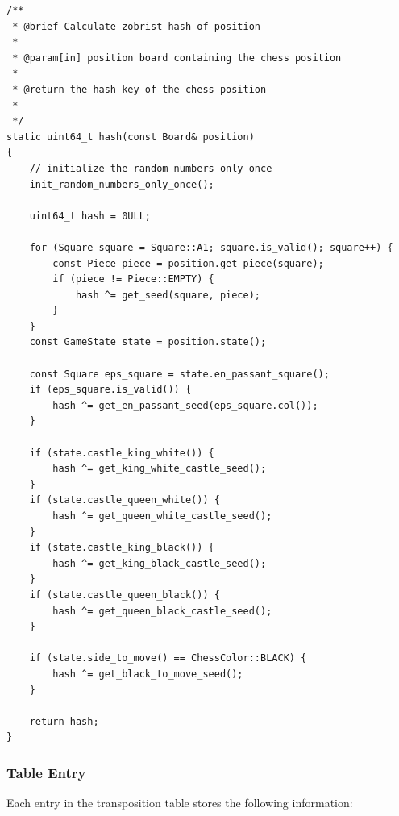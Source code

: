 \begin{lstlisting}[breaklines=true, frame=single, caption={Code example to calculate zobrist hash of position}, label={lst:zobrist_calculate_hash}]
/**
 * @brief Calculate zobrist hash of position
 * 
 * @param[in] position board containing the chess position
 * 
 * @return the hash key of the chess position
 * 
 */
static uint64_t hash(const Board& position)
{
    // initialize the random numbers only once
    init_random_numbers_only_once();   

    uint64_t hash = 0ULL;

    for (Square square = Square::A1; square.is_valid(); square++) {
        const Piece piece = position.get_piece(square);
        if (piece != Piece::EMPTY) {
            hash ^= get_seed(square, piece);
        }
    }
    const GameState state = position.state();

    const Square eps_square = state.en_passant_square();
    if (eps_square.is_valid()) {
        hash ^= get_en_passant_seed(eps_square.col());
    }

    if (state.castle_king_white()) {
        hash ^= get_king_white_castle_seed();
    }
    if (state.castle_queen_white()) {
        hash ^= get_queen_white_castle_seed();
    }
    if (state.castle_king_black()) {
        hash ^= get_king_black_castle_seed();
    }
    if (state.castle_queen_black()) {
        hash ^= get_queen_black_castle_seed();
    }

    if (state.side_to_move() == ChessColor::BLACK) {
        hash ^= get_black_to_move_seed();
    }

    return hash;
}
\end{lstlisting}

\subsubsection{Table Entry}

Each entry in the transposition table stores the following information:

